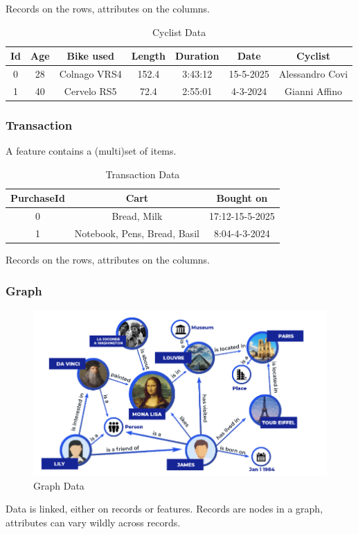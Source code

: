 Records on the rows, attributes on the columns.

\begin{table}[h!]
\centering
\begin{tabular}{ccccccc}
\toprule
\textbf{Id} & \textbf{Age} & \textbf{Bike used} & \textbf{Length} & \textbf{Duration} & \textbf{Date} & \textbf{Cyclist} \\
\midrule
0 & 28 & Colnago VRS4 & 152.4 & 3:43:12 & 15-5-2025 & Alessandro Covi \\
1 & 40 & Cervelo RS5  & 72.4  & 2:55:01 & 4-3-2024  & Gianni Affino  \\
\bottomrule
\end{tabular}
\caption{Cyclist Data}
\end{table}

\subsubsection{Transaction}
A feature contains a (multi)set of items.

\begin{table}[h!]
\centering
\begin{tabular}{ccc}
\toprule
\textbf{PurchaseId} & \textbf{Cart} & \textbf{Bought on} \\
\midrule
0 & Bread, Milk & 17:12-15-5-2025 \\
1 & Notebook, Pens, Bread, Basil & 8:04-4-3-2024 \\
\bottomrule
\end{tabular}
\caption{Transaction Data}
\end{table}

Records on the rows, attributes on the columns.

\subsubsection{Graph}
\begin{figure}[htbp]
   \centering
   \includegraphics{images/01/graph.png}
   \caption{Graph Data}
   \label{fig:01/graph}
\end{figure}
Data is linked, either on records or features.
Records are nodes in a graph, attributes can vary wildly across records.

